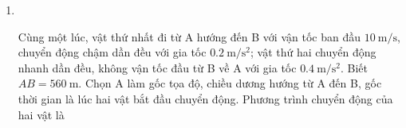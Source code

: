 \begin{enumerate}[label=\bfseries Câu \arabic*:,leftmargin=1.5cm]
{}

	\item 	{}\\
	{Cùng một lúc, vật thứ nhất đi từ A hướng đến B với vận tốc ban đầu $\SI{10}{\meter/\second}$, chuyển động chậm dần đều với gia tốc $\SI{0.2}{\meter/\second^2}$; vật thứ hai chuyển động nhanh dần đều, không vận tốc đầu từ B về A với gia tốc $\SI{0.4}{\meter/\second^2}$. Biết $AB = \SI{560}{\meter}$. Chọn A làm gốc tọa độ, chiều dương hướng từ A đến B, gốc thời gian là lúc hai vật bắt đầu chuyển động. Phương trình chuyển động của hai vật là
	
}


\end{enumerate}
